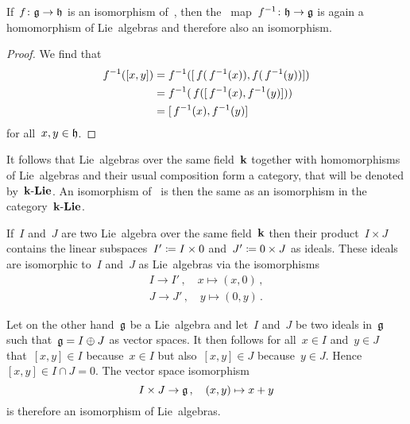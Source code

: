 \begin{lemma}
 If~$f \colon \mathfrak{g} \to \mathfrak{h}$ is an isomorphism of~{\liealgebras{$\kf$}}, then the~{\linear{$\kf$}} map~$f^{-1} \colon \mathfrak{h} \to \mathfrak{g}$ is again a homomorphism of Lie~algebras and therefore also an isomorphism.
\end{lemma}


\begin{proof}
 We find that
 \begin{align*}
  f^{-1}( [x,y] )
  &=
  f^{-1}( [\, f(\, f^{-1}(x)), f(\, f^{-1}(y)) ] ) \\
  &=
  f^{-1}(\, f( [\, f^{-1}(x), f^{-1}(y)] )) \\
  &=
  [\, f^{-1}(x), f^{-1}(y)]
 \end{align*}
 for all~$x, y \in \mathfrak{h}$.
\end{proof}


\begin{remark}
 It follows that Lie~algebras over the same field~$\kf$ together with homomorphisms of Lie~algebras and their usual composition form a category, that will be denoted by~$\mathbf{k}\text{-}\mathbf{Lie}$.
 An isomorphism of~{\liealgebras{$\kf$}} is then the same as an isomorphism in the category~$\mathbf{k}\text{-}\mathbf{Lie}$.
\end{remark}


\begin{example}
  \label{direct sum of ideals}
  If~$I$ and~$J$ are two Lie~algebra over the same field~$\kf$ then their product~$I \times J$ contains the linear subspaces~$I' \coloneqq I \times 0$ and~$J' \coloneqq 0 \times J$ as ideals.
  These ideals are isomorphic to~$I$ and~$J$ as Lie~algebras via the isomorphisms
  \begin{align*}
    I
    \to
    I'  \,,
    \quad
    x
    \mapsto
    (x,0) \,,
  \\
    J
    \to
    J'  \,,
    \quad
    y
    \mapsto
    (0,y) \,.
  \end{align*}
  
  Let on the other hand~$\mathfrak{g}$ be a Lie~algebra and let~$I$ and~$J$ be two ideals in~$\mathfrak{g}$ such that~$\mathfrak{g} = I \oplus J$ as vector spaces.
  It then follows for all~$x \in I$ and~$y \in J$ that~$[x,y] \in I$ because~$x \in I$ but also~$[x,y] \in J$ because~$y \in J$.
  Hence~$[x,y] \in I \cap J = 0$.
  The vector space isomorphism
  \[
    I \times J
    \to
    \mathfrak{g} \,,
    \quad
    (x,y)
    \mapsto
    x+y
  \]
  is therefore an isomorphism of Lie~algebras.
\end{example}


